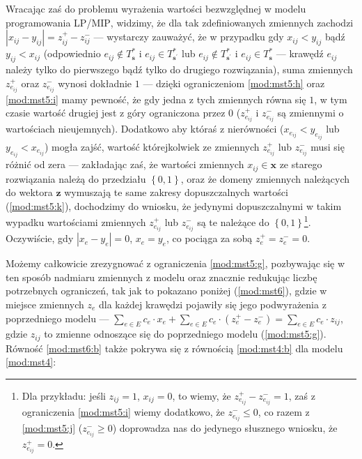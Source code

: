 Wracając zaś do problemu wyrażenia wartości bezwzględnej w modelu programowania \textsc{LP}/\textsc{MIP}, widzimy, że dla tak zdefiniowanych zmiennych zachodzi $\left| x_{ij} - y_{ij} \right| = z_{ij}^{+} - z_{ij}^{-}$ --- wystarczy zauważyć, że w przypadku gdy $x_{ij} < y_{ij}$ bądź $y_{ij} < x_{ij}$ (odpowiednio $e_{ij} \notin T^{\ast}_{\textbf{s}}$ i $e_{ij} \in T^{\ast}_{\textbf{s}^{\prime}}$ lub $e_{ij} \notin T^{\ast}_{\textbf{s}^{\prime}}$ i $e_{ij} \in T^{\ast}_{\textbf{s}}$ --- krawędź $e_{ij}$ należy tylko do pierwszego bądź tylko do drugiego rozwiązania), suma zmiennych $z_{e_{ij}}^{+}$ oraz $z_{e_{ij}}^{-}$ wynosi dokładnie $1$ --- dzięki ograniczeniom \ref{mod:mst5:h} oraz \ref{mod:mst5:i} mamy pewność, że gdy jedna z tych zmiennych równa się $1$, w tym czasie wartość drugiej jest z góry ograniczona przez $0$ ($z^{+}_{e_{ij}}$ i $z^{-}_{e_{ij}}$ są zmiennymi o wartościach nieujemnych). Dodatkowo aby któraś z nierówności ($x_{e_{ij}} < y_{e_{ij}}$ lub $y_{e_{ij}} < x_{e_{ij}}$) mogła zajść, wartość którejkolwiek ze zmiennych $z_{e_{ij}}^{+}$ lub $z_{e_{ij}}^{-}$ musi się różnić od zera --- zakładając zaś, że wartości zmiennych $x_{ij} \in \textbf{x}$ ze starego rozwiązania należą do przedziału $\left\{ 0 , 1 \right\}$, oraz że domeny zmiennych należących do wektora $\textbf{z}$ wymuszają te same zakresy dopuszczalnych wartości (\ref{mod:mst5:k}), dochodzimy do wniosku, że jedynymi dopuszczalnymi w takim wypadku wartościami zmiennych $z_{e_{ij}}^{+}$ lub $z_{e_{ij}}^{-}$ są te należące do $\left\{ 0, 1 \right\}$\footnote{Dla przykładu: jeśli $z_{ij} = 1$, $x_{ij} = 0$, to wiemy, że $z_{e_{ij}}^{+} - z_{e_{ij}}^{-} = 1$, zaś z ograniczenia \ref{mod:mst5:i} wiemy dodatkowo, że $z_{e_{ij}}^{-} \leqslant 0$, co razem z \ref{mod:mst5:j} ($z_{e_{ij}}^{-} \geqslant 0$) doprowadza nas do jedynego słusznego wniosku, że $z_{e_{ij}}^{+} = 0$.}. Oczywiście, gdy $\left| x_{e} - y_{e} \right| = 0$, $x_{e} = y_{e}$, co pociąga za sobą $z_{e}^{+} = z_{e}^{-} = 0$.

Możemy całkowicie zrezygnować z ograniczenia \ref{mod:mst5:g}, pozbywając się w ten sposób nadmiaru zmiennych z modelu oraz znacznie redukując liczbę potrzebnych ograniczeń, tak jak to pokazano poniżej (\ref{mod:mst6}), gdzie w miejsce zmiennych $z_{e}$ dla każdej krawędzi pojawiły się jego podwyrażenia z poprzedniego modelu --- $\sum_{e \in E} c_{e} \cdot x_{e} + \sum_{e \in E} c_{e} \cdot \left( z^{+}_{e} - z^{-}_{e} \right) = \sum_{e \in E} c_{e} \cdot z_{ij}$, gdzie $z_{ij}$ to zmienne odnoszące się do poprzedniego modelu (\ref{mod:mst5:g}). Równość \ref{mod:mst6:b} także pokrywa się z równością \ref{mod:mst4:b} dla modelu \ref{mod:mst4}:

